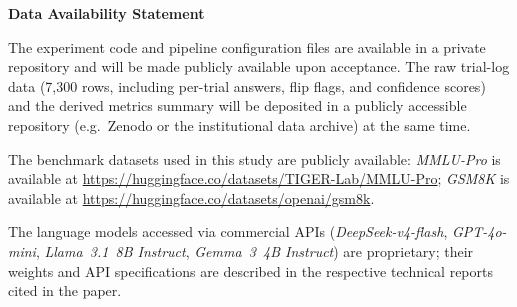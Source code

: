 
\noindent\textbf{Data Availability Statement}

\medskip
\noindent
The experiment code and pipeline configuration files are available in a
private repository and will be made publicly available upon acceptance.
The raw trial-log data (7,300 rows, including per-trial answers, flip flags,
and confidence scores) and the derived metrics summary will be deposited in
a publicly accessible repository (e.g.\ Zenodo or the institutional data
archive) at the same time.

The benchmark datasets used in this study are publicly available:
\textit{MMLU-Pro} \citep{wang2024mmlupro} is available at
\url{https://huggingface.co/datasets/TIGER-Lab/MMLU-Pro};
\textit{GSM8K} \citep{cobbe2021training} is available at
\url{https://huggingface.co/datasets/openai/gsm8k}.

The language models accessed via commercial APIs
(\textit{DeepSeek-v4-flash}, \textit{GPT-4o-mini},
\textit{Llama~3.1~8B Instruct}, \textit{Gemma~3~4B Instruct})
are proprietary; their weights and API specifications are described in the
respective technical reports cited in the paper.
